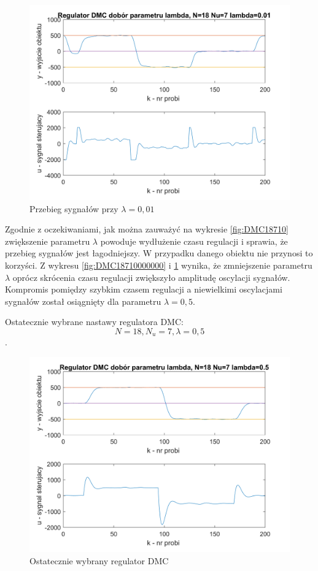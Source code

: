 \documentclass[a4paper, 10pt]{article}
\begin{document}
\begin{figure}[H]
	\centering
	\includegraphics[width=0.9\linewidth]{DMC1871000000}
	\caption{Przebieg sygnałów przy $\lambda=0,01$}
	\label{fig:DMC1871000000}
\end{figure}
Zgodnie z oczekiwaniami, jak można zauważyć na wykresie \ref{fig:DMC18710} zwiększenie parametru $\lambda$ powoduje wydłużenie czasu regulacji i sprawia, że przebieg sygnałów jest łagodniejszy. W przypadku danego obiektu nie przynosi to korzyści. Z wykresu \ref{fig:DMC18710000000} i \ref{fig:DMC1871000000} wynika, że zmniejszenie parametru $\lambda$ oprócz skrócenia czasu regulacji zwiększyło amplitudę oscylacji sygnałów. Kompromis pomiędzy szybkim czasem regulacji a niewielkimi oscylacjami sygnałów został osiągnięty dla parametru $\lambda=0,5$.

Ostatecznie wybrane nastawy regulatora DMC:
\[N=18, N_{u}=7, \lambda=0,5\].

\begin{figure}[H]
	\centering
	\includegraphics[width=0.9\linewidth]{DMC18750000000}
	\caption{Ostatecznie wybrany regulator DMC}
	\label{fig:DMCost}
\end{figure}
\end{document}
